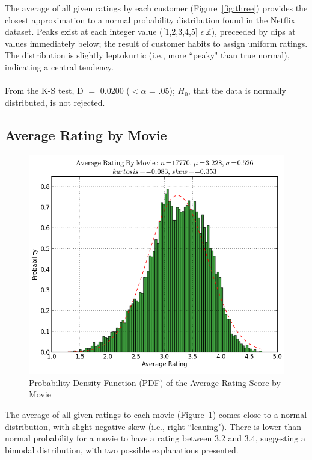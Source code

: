 \documentclass[prodmode,acmtecs]{acmsmall}
\begin{document}
The average of all given ratings by each customer (Figure~\ref{fig:three}) provides the closest approximation to a normal probability distribution found in the Netflix dataset. Peaks exist at each integer value ([1,2,3,4,5] $\epsilon\ \mathbb{Z}$), preceeded by dips at values immediately below; the result of customer habits to assign uniform ratings. The distribution is slightly leptokurtic (i.e., more ``peaky" than true normal), indicating a central tendency.
\\
\\
From the K-S test, D $=$ 0.0200  ($<\alpha$ = .05); $H_0$, that the data is normally distributed, is not rejected.

\medskip

\subsection{Average Rating by Movie}

\begin{figure}
\centerline{\includegraphics[scale=.6]{average_rating_by_movie.png}}
\caption{Probability Density Function (PDF) of the Average Rating Score by Movie}
\label{fig:four}
\end{figure}

The average of all given ratings to each movie (Figure~\ref{fig:four}) comes close to a normal distribution, with slight negative skew (i.e., right ``leaning"). There is lower than normal probability for a movie to have a rating between 3.2 and 3.4, suggesting a bimodal distribution, with two possible explanations presented.
\end{document}
